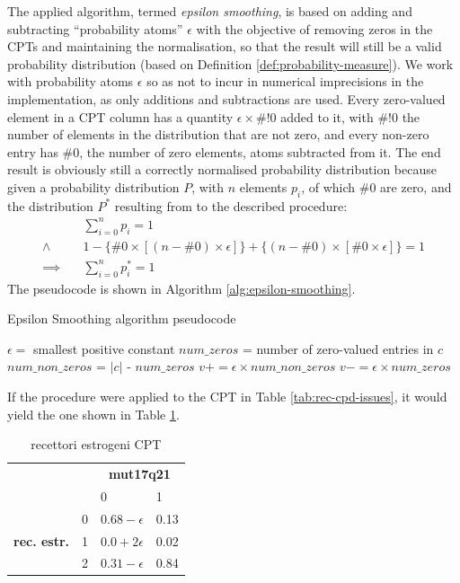 The applied algorithm, termed \textit{epsilon smoothing}, is based on adding and subtracting \enquote{probability atoms} $\epsilon$ with the objective of removing zeros in the CPTs and maintaining the normalisation, so that the result will still be  a valid probability distribution (based on Definition \ref{def:probability-measure}).
We work with probability atoms $\epsilon$ so as not to incur in numerical imprecisions in the implementation, as only additions and subtractions are used.
Every zero-valued element in a CPT column has a quantity $\epsilon \times \#!0$ added to it, with $\#!0$ the number of elements in the distribution that are not zero, and every non-zero entry has $\#0$, the number of zero elements, atoms subtracted from it.
The end result is obviously still a correctly normalised probability distribution because given a probability distribution $P$, with $n$ elements $p_i$, of which $\#0$ are zero, and the  distribution $P^*$ resulting from to the described procedure:
\begin{align}
	&\sum\limits_{i=0}^{n} p_i = 1 \\
	\wedge  \quad &1 - \{ \#0 \times [(n - \#0) \times \epsilon] \} + \{ (n - \#0) \times [\#0 \times \epsilon] \}  = 1 \\
	\implies \quad  &\sum\limits_{i=0}^{n} p^*_i = 1
\end{align}
The pseudocode is shown in Algorithm \ref{alg:epsilon-smoothing}.

\begin{algorithm}[htp!]
	\caption{Epsilon Smoothing algorithm pseudocode}
	\label{alg:epsilon-smoothing}
	\begin{algorithmic}[1]
		\State $\epsilon=$ smallest positive constant
			 
				\State $num\_zeros$ = number of zero-valued entries in $c$
				\State $num\_non\_zeros$ = $|c|$ - $num\_zeros$
						\State $v += \epsilon \times num\_non\_zeros$
					\Else
						\State $v -= \epsilon \times num\_zeros$
					\EndIf
				\EndFor
			\EndFor
		\EndFor
	\end{algorithmic}
\end{algorithm}

If the procedure were applied to the CPT in Table \ref{tab:rec-cpd-issues}, it would yield the one shown in Table \ref{tab:rec-cpd-epsilon}.

\begin{table}[htbp]
\centering
\caption{recettori estrogeni CPT}
\begin{tabularx}{0.5\textwidth}{ccXX}
\toprule
      & &  \multicolumn{2}{c}{\textbf{mut17q21}} \\
\cmidrule(lr){3-4}
 & & 0 & 1    \\ 
 \multirow{3}{*}{\textbf{rec. estr.}}  & 0 & $0.68 - \epsilon$ & 0.13  \\
 & 1 & $0.0 + 2\epsilon$ & 0.02    \\
 & 2 & $0.31 - \epsilon$ & 0.84 \\
\bottomrule
\end{tabularx}
\label{tab:rec-cpd-epsilon}
\end{table}


